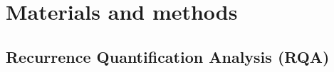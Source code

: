 \section{Materials and methods}\label{sec2:Materials and methods}

\subsection{Recurrence Quantification Analysis (RQA)}
